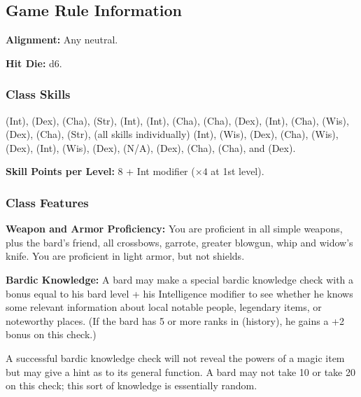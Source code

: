 \subsection{Game Rule Information}
\textbf{Alignment:} Any neutral.

\textbf{Hit Die:} d6.

\subsubsection{Class Skills}
 (Int),  (Dex),  (Cha),  (Str),  (Int),  (Int),  (Cha),  (Cha),  (Dex),  (Int),  (Cha),  (Wis),  (Dex),  (Cha),  (Str),  (all skills individually) (Int),  (Wis),  (Dex),  (Cha),  (Wis),  (Dex),  (Int),  (Wis),  (Dex),  (N/A),  (Dex),  (Cha),  (Cha), and  (Dex).

\textbf{Skill Points per Level:} 8 + Int modifier ($\times4$ at 1st level).

\subsubsection{Class Features}

\textbf{Weapon and Armor Proficiency:} You are proficient in all simple weapons, plus the bard's friend, all crossbows, garrote, greater blowgun, whip and widow's knife. You are proficient in light armor, but not shields.


\textbf{Bardic Knowledge:} A bard may make a special bardic knowledge check with a bonus equal to his bard level + his Intelligence modifier to see whether he knows some relevant information about local notable people, legendary items, or noteworthy places. (If the bard has 5 or more ranks in  (history), he gains a +2 bonus on this check.)

A successful bardic knowledge check will not reveal the powers of a magic item but may give a hint as to its general function. A bard may not take 10 or take 20 on this check; this sort of knowledge is essentially random.



